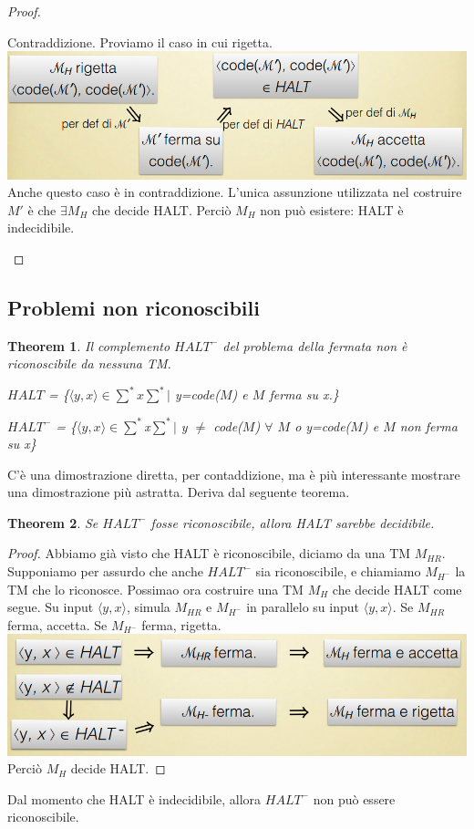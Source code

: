 \documentclass[a4paper, 12pt]{article}
\newtheorem{theorem}{Theorem}[section]
\begin{document}
\begin{proof}
\begin{enumerate}
Contraddizione. Proviamo il caso in cui rigetta.\\
\includegraphics[scale=0.4]{HALT5.png}\\
Anche questo caso \`e in contraddizione. L'unica assunzione utilizzata nel costruire $M'$ \`e che $\exists M_H$ che decide HALT. Perci\`o $M_H$ non pu\`o esistere: HALT \`e indecidibile.
\end{enumerate}
\end{proof}

\subsection{Problemi non riconoscibili}
\begin{theorem}
Il complemento $HALT^{-}$ del problema della fermata non \`e riconoscibile da nessuna TM.
\begin{center}
$HALT$ = \{$\langle y,x \rangle \in \sum^{*}x\sum^{*}|$ y=code($M$) e $M$ ferma su x.\}
\end{center}
\begin{center}
$HALT^{-}$ = \{$\langle y,x \rangle \in \sum^{*}$x$\sum^{*}|$ y $\neq$ code($M$) $\forall$ $M$ o y=code($M$) e $M$ non ferma su x\}
\end{center}
\end{theorem}
C'\`e una dimostrazione diretta, per contaddizione, ma \`e pi\`u interessante mostrare una dimostrazione pi\`u astratta. Deriva dal seguente teorema.
\begin{theorem}
Se $HALT^{-}$ fosse riconoscibile, allora HALT sarebbe decidibile.
\end{theorem}
\begin{proof}
Abbiamo gi\`a visto che HALT \`e riconoscibile, diciamo da una TM $M_{HR}$. Supponiamo per assurdo che anche $HALT^{-}$ sia riconoscibile, e chiamiamo $M_{H^{-}}$ la TM che lo riconosce. Possimao ora costruire una TM $M_H$ che decide HALT come segue. Su input $\langle y,x \rangle$, simula $M_{HR}$ e $M_{H^{-}}$ in parallelo su input $\langle y,x \rangle$. Se $M_{HR}$ ferma, accetta. Se $M_{H^{-}}$ ferma, rigetta.\\
\includegraphics[scale=0.4]{TM_complemento_HALT.png}\\
Perci\`o $M_H$ decide HALT.
\end{proof}
Dal momento che HALT \`e indecidibile, allora $HALT^-$ non pu\`o essere riconoscibile.
\end{document}
